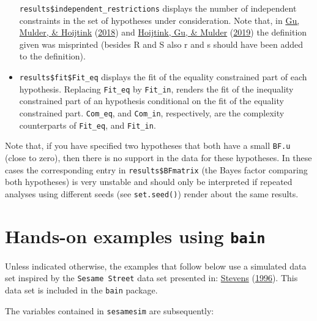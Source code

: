 \documentclass[
]{book}
\begin{document}
\begin{itemize}
  \texttt{results\$independent\_restrictions} displays the number of
  independent constraints in the set of hypotheses under consideration. Note that,
  in \protect\hyperlink{ref-gu2018approximated}{Gu, Mulder, \& Hoijtink} (\protect\hyperlink{ref-gu2018approximated}{2018}) and \protect\hyperlink{ref-hoijtink2019bayesian}{Hoijtink, Gu, \& Mulder} (\protect\hyperlink{ref-hoijtink2019bayesian}{2019}) the
  definition given was misprinted (besides R and S also r and s should have been
  added to the definition).
\item
  \texttt{results\$fit\$Fit\_eq} displays the fit of the equality constrained
  part of each hypothesis. Replacing \texttt{Fit\_eq} by \texttt{Fit\_in}, renders
  the fit of the inequality constrained part of an hypothesis conditional on
  the fit of the equality constrained part. \texttt{Com\_eq}, and \texttt{Com\_in},
  respectively, are the complexity counterparts of \texttt{Fit\_eq}, and
  \texttt{Fit\_in}.
\end{itemize}

Note that, if you have specified two hypotheses that both have a small
\texttt{BF.u} (close to zero), then there is no support in the data for these
hypotheses. In these cases the corresponding entry in \texttt{results\$BFmatrix}
(the Bayes factor comparing both hypotheses) is very unstable and should
only be interpreted if repeated analyses using different seeds
(see \texttt{set.seed()}) render about the same results.

\hypertarget{hands-on-examples-using-bain}{%
\chapter{\texorpdfstring{Hands-on examples using \texttt{bain}}{Hands-on examples using bain}}\label{hands-on-examples-using-bain}}

Unless indicated otherwise, the examples that follow below use a simulated
data set inspired by the \texttt{Sesame\ Street} data set presented in:
\protect\hyperlink{ref-stevens1996applied}{Stevens} (\protect\hyperlink{ref-stevens1996applied}{1996}). This data set is included in the
\texttt{bain} package.

The variables contained in \texttt{sesamesim} are subsequently:
\end{document}
